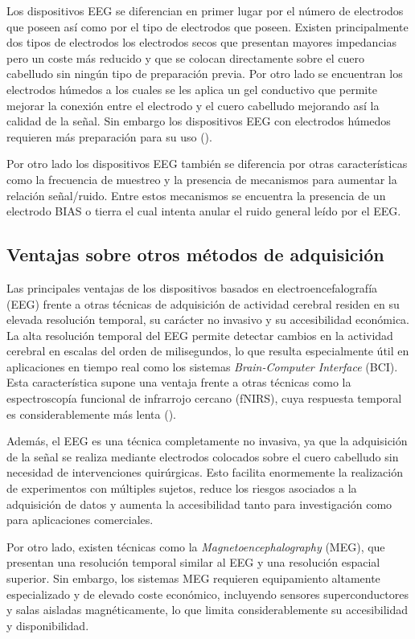 Los dispositivos EEG se diferencian en primer lugar por el número de electrodos que poseen así como por el tipo de electrodos que poseen. Existen principalmente dos tipos de electrodos los electrodos secos que presentan mayores impedancias pero un coste más reducido y que se colocan directamente sobre el cuero cabelludo sin ningún tipo de preparación previa. Por otro lado se encuentran los electrodos húmedos a los cuales se les aplica un gel conductivo que permite mejorar la conexión entre el electrodo y el cuero cabelludo mejorando así la calidad de la señal. Sin embargo los dispositivos EEG con electrodos húmedos requieren más preparación para su uso (\cite{usakli2010improvement}).

Por otro lado los dispositivos EEG también se diferencia por otras características como la frecuencia de muestreo y la presencia de mecanismos para aumentar la relación señal/ruido. Entre estos mecanismos se encuentra la presencia de un electrodo BIAS o tierra el cual intenta anular el ruido general leído por el EEG. 

\subsection{Ventajas sobre otros métodos de adquisición}
\label{subsec:ventajasEEG}

Las principales ventajas de los dispositivos basados en electroencefalografía (EEG) frente a otras técnicas de adquisición de actividad cerebral residen en su elevada resolución temporal, su carácter no invasivo y su accesibilidad económica. La alta resolución temporal del EEG permite detectar cambios en la actividad cerebral en escalas del orden de milisegundos, lo que resulta especialmente útil en aplicaciones en tiempo real como los sistemas \textit{Brain-Computer Interface} (BCI). Esta característica supone una ventaja frente a otras técnicas como la espectroscopía funcional de infrarrojo cercano (fNIRS), cuya respuesta temporal es considerablemente más lenta (\cite{naseer2015fnirs}).

Además, el EEG es una técnica completamente no invasiva, ya que la adquisición de la señal se realiza mediante electrodos colocados sobre el cuero cabelludo sin necesidad de intervenciones quirúrgicas. Esto facilita enormemente la realización de experimentos con múltiples sujetos, reduce los riesgos asociados a la adquisición de datos y aumenta la accesibilidad tanto para investigación como para aplicaciones comerciales.

Por otro lado, existen técnicas como la \textit{Magnetoencephalography} (MEG), que presentan una resolución temporal similar al EEG y una resolución espacial superior. Sin embargo, los sistemas MEG requieren equipamiento altamente especializado y de elevado coste económico, incluyendo sensores superconductores y salas aisladas magnéticamente, lo que limita considerablemente su accesibilidad y disponibilidad.

